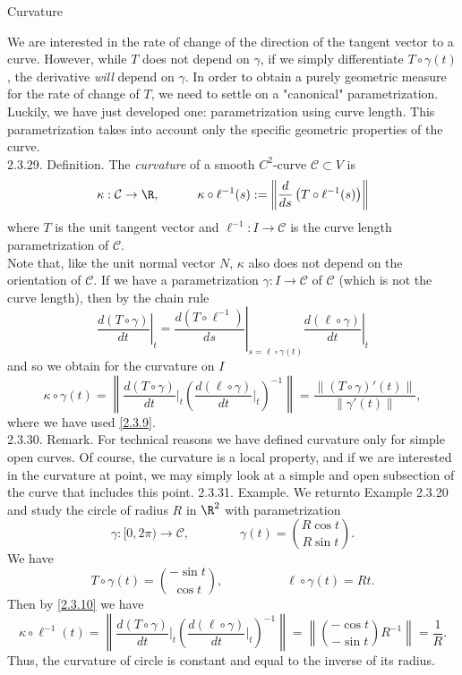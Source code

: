 \documentclass[smaller,hyperref={CJKbookmarks=true}]{beamer}
\begin{document}
\begin{frame}{Curvature}
\begin{spacing}{1}
We are interested in the rate of change of the direction of the tangent
vector to a curve. However, while $T$ does not depend on $\gamma$, if we simply dif{}ferentiate $T\circ\gamma(t)$, the derivative \emph{will} depend on $\gamma$. In order to obtain a purely geometric measure for the rate of change of $T$, we need to settle on a "canonical" parametrization. Luckily, we have just developed one:
parametrization using curve length. This parametrization takes into
account only the specific geometric properties of the curve.\\[5pt]
\alert{2.3.29. Definition.} The \emph{curvature} of a smooth $C^2$-curve $\mathcal{C}\subset V$ is
\[\kappa:\mathcal{C}\to\R,\qquad\quad
\kappa\circ\ell^{-1}(s):=\left\|\frac{d}{ds}
\left(T\circ\ell^{-1}(s)\right)\right\|\]
where $T$ is the unit tangent vector and $\ell^{-1}:I\to\mathcal{C}$ is the curve length parametrization of $\mathcal{C}$.\\[5pt]
Note that, like the unit normal vector $N$, $\kappa$ also does not depend on the orientation of $\mathcal{C}$.
\newpage
If we have a parametrization $\gamma:I\to\mathcal{C}$ of $\mathcal{C}$ (which is not the curve length), then by the chain rule
\[\left.\frac{d(T\circ\gamma)}{dt}\right|_t=
\left.\frac{d(T\circ\ell^{-1})}{ds}\right|_{s=\ell\circ\gamma(t)}
\left.\frac{d(\ell\circ\gamma)}{dt}\right|_t\]
and so we obtain for the curvature on $I$
\begin{equation}\label{2.3.10}
  \kappa\circ\gamma(t)=\left\|\frac{d(T\circ\gamma)}{dt}\Big|_t\left(
  \frac{d(\ell\circ\gamma)}{dt}\Big|_t\right)^{-1}\right\|
  =\frac{\|(T\circ\gamma)'(t)\|}{\|\gamma'(t)\|},
\end{equation}
where we have used \eqref{2.3.9}.\\[5pt]
\alert{2.3.30. Remark.} For technical reasons we have defined curvature only for
simple open curves. Of course, the curvature is a local property, and if we
are interested in the curvature at point, we may simply look at a simple
and open subsection of the curve that includes this point.
\newpage
\alert{2.3.31. Example.} We returnto Example 2.3.20 and study the circle of radius $R$ in $\R^2$ with parametrization
\[\gamma:[0,2\pi)\to\mathcal{C},\qquad\qquad
\gamma(t)=\binom{R\cos t}{R\sin t}.\]
We have
\[T\circ\gamma(t)=\binom{-\sin t}{\cos t},\qquad\qquad\quad
\ell\circ\gamma(t)=Rt.\]
Then by \eqref{2.3.10} we have
\[\kappa\circ\ell^{-1}(t)=\left\|\frac{d(T\circ\gamma)}{dt}\Big|_t
\left(\frac{d(\ell\circ\gamma)}{dt}\Big|_t\right)^{-1}\right\|=
\left\|\binom{-\cos t}{-\sin t}R^{-1}\right\|=\frac{1}{R}.\]
Thus, the curvature of circle is constant and equal to the inverse of its
radius.
\end{spacing}
\end{frame}
\end{document}
